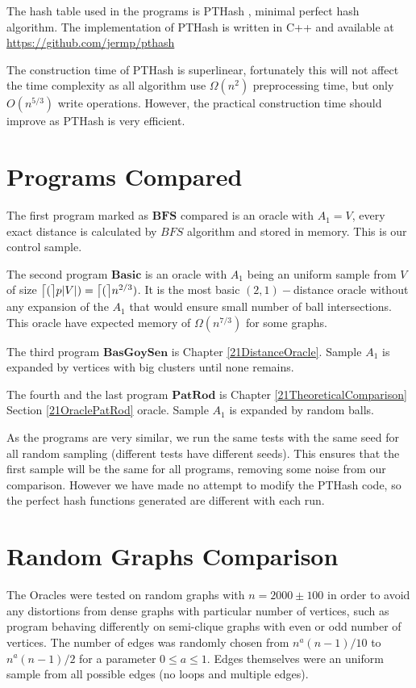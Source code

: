 \documentclass[shortabstract, lic, english]{iithesis}
\theoremstyle{definition} \newtheorem{definition}{Definition}[chapter]
\theoremstyle{plain} \newtheorem{remark}[definition]{Observation}
\theoremstyle{plain} \newtheorem{theorem}[definition]{Theorem}
\theoremstyle{plain} \newtheorem{lemma}[definition]{Lemma}
\theoremstyle{plain} \newtheorem{conjecture}[definition]{Conjecture}
\DeclarePairedDelimiter{\ceil}{\lceil}{\rceil}
\begin{document}
The hash table used in the programs is PTHash \cite{hashTablePractical}, minimal perfect hash algorithm.
The implementation of PTHash is written in C++ and available at
\newline 
\url{https://github.com/jermp/pthash}

The construction time of PTHash is superlinear, fortunately this will not affect the time complexity as all algorithm use $\Omega(n^2)$ preprocessing time,
but only $O(n^{5/3})$ write operations. However, the practical construction time should improve as PTHash is very efficient.

\section{Programs Compared}

The first program marked as $\mathbf{BFS}$ compared is an oracle with $A_1 = V$, 
every exact distance is calculated by $BFS$ algorithm and stored in memory.
This is our control sample.

The second program $\mathbf{Basic}$ is an oracle with $A_1$ being an uniform sample from $V$ of size $\ceil[\big](p|V|) = \ceil[\big](n^{2/3})$.
It is the most basic $(2,1)-$distance oracle without any expansion of the $A_1$ that would ensure small number of ball intersections.
This oracle have expected memory of $\Omega(n^{7/3})$ for some graphs.

The third program $\mathbf{BasGoySen}$ is Chapter \ref{21DistanceOracle}. Sample $A_1$ is expanded by vertices with big clusters until none remains.

The fourth and the last program $\mathbf{PatRod}$ is Chapter \ref{21TheoreticalComparison} Section \ref{21OraclePatRod} oracle. Sample $A_1$ is expanded by random balls.

As the programs are very similar, we run the same tests with the same seed for all random sampling (different tests have different seeds).
This ensures that the first sample will be the same for all programs, removing some noise from our comparison.
However we have made no attempt to modify the PTHash code, so the perfect hash functions generated are different with each run.



\section{Random Graphs Comparison}

The Oracles were tested on random graphs with $n = 2000 \pm 100$ in order to avoid any distortions from dense graphs with particular number of vertices, such as program behaving differently on semi-clique graphs with even or odd number of vertices.
The number of edges was randomly chosen from $n^a(n - 1)/10$ to $n^a(n-1)/2$ for a parameter $0 \leq a \leq 1$.
Edges themselves were an uniform sample from all possible edges (no loops and multiple edges).
\end{document}

